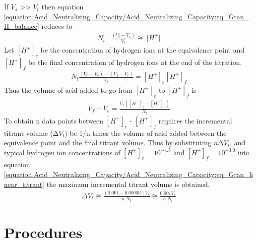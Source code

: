 \documentclass[letterpaper,10pt,english]{sphinxmanual}
\begin{document}
If \(V_s\) \textgreater{}\textgreater{} \(V_t\) then equation \eqref{equation:Acid_Neutralizing_Capacity/Acid_Neutralizing_Capacity:eq_Gran_H_balance} reduces to
\begin{equation}\label{equation:Acid_Neutralizing_Capacity/Acid_Neutralizing_Capacity:Acid_Neutralizing_Capacity/Acid_Neutralizing_Capacity:4}
\begin{split}{N}_{{t}} {\; \; \; }\frac{(V_{t} -V_{e} )}{V_{s} } \cong {\; [H}^{+} {]}\end{split}
\end{equation}
Let \([H^+]_e\) be the concentration of hydrogen ions at the equivalence point and \([H^+]_f\) be the final concentration of hydrogen ions at the end of the titration.
\begin{equation}\label{equation:Acid_Neutralizing_Capacity/Acid_Neutralizing_Capacity:Acid_Neutralizing_Capacity/Acid_Neutralizing_Capacity:5}
\begin{split}N_t \frac{(V_e - V_e)-(V_f - V_e)}{V_s} =[H^+]_e [H^+]_f\end{split}
\end{equation}
Thus the volume of acid added to go from \([H^+]_e\) to \([H^+]_f\) is
\begin{equation}\label{equation:Acid_Neutralizing_Capacity/Acid_Neutralizing_Capacity:eq_Gran_linear_titrant}
\begin{split}V_f - V_e =\frac{V_s \left([H^+]_f -[H^+]_e \right)}{N_t}\end{split}
\end{equation}
To obtain n data points between \([H^+]_e\) - \([H^+]_f\) requires the incremental titrant volume (\(\mathrm{\Delta} V_t\)) be 1/n times the volume of acid added between the equivalence point and the final titrant volume. Thus by substituting \(n\mathrm{\Delta}V_t\), and typical hydrogen ion concentrations of \([H^+]_e = 10^{-4.5}\) and \([H^+]_f = 10^{-3.0}\) into equation \eqref{equation:Acid_Neutralizing_Capacity/Acid_Neutralizing_Capacity:eq_Gran_linear_titrant} the maximum incremental titrant volume is obtained.
\begin{equation}\label{equation:Acid_Neutralizing_Capacity/Acid_Neutralizing_Capacity:Acid_Neutralizing_Capacity/Acid_Neutralizing_Capacity:6}
\begin{split}\Delta V_t\cong \frac{(0.001-0.00003)V_s }{n\; N_t} \cong \frac{0.001V_s}{n\; N_t}\end{split}
\end{equation}

\section{Procedures}
\label{\detokenize{Acid_Neutralizing_Capacity/Acid_Neutralizing_Capacity:procedures}}\label{\detokenize{Acid_Neutralizing_Capacity/Acid_Neutralizing_Capacity:heading-anc-procedures}}
\end{document}

